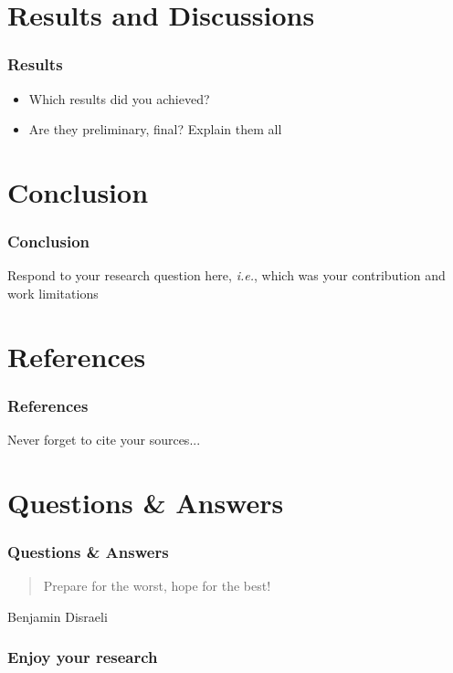 \documentclass[10pt, aspectratio=169]{beamer}
\begin{document}
\section{Results and Discussions}
\begin{frame}
  \frametitle{Results}

  \begin{itemize}
  \item Which results did you achieved? \pause
  \item Are they preliminary, final? Explain them all
  \end{itemize}		
\end{frame}

\section{Conclusion}
\begin{frame}
  \frametitle{Conclusion}
  Respond to your research question here, \emph{i.e.}, which was your
  contribution and work limitations
\end{frame}


\section{References}
\begin{frame}
  \frametitle{References}
  
  \scriptsize
  Never forget to cite your sources...
  
  \nocite{Ganssle:2000aa, Liu:1973aa, Douglass:2003aa}
  
  \setlength\bibitemsep{\baselineskip}
  \renewcommand*{\bibfont}{\scriptsize}
  \printbibliography
\end{frame}

\section{Questions \& Answers}
\begin{frame}
  \frametitle{Questions \& Answers}

  \begin{quotation}
  Prepare for the worst, hope for the best!\\    
  \end{quotation}
  \flushright
  Benjamin Disraeli
\end{frame}

\begin{frame}
  \frametitle{Enjoy your research}
  
\end{frame}
\end{document}
